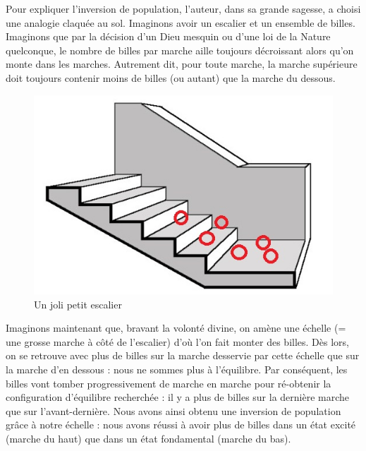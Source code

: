 Pour expliquer l'inversion de population, l'auteur, dans sa grande sagesse, a choisi une analogie claquée au sol. Imaginons avoir un escalier et un ensemble de billes. Imaginons que par la décision d'un Dieu mesquin ou d'une loi de la Nature quelconque, le nombre de billes par marche aille toujours décroissant alors qu'on monte dans les marches. Autrement dit, pour toute marche, la marche supérieure doit toujours contenir moins de billes (ou autant) que la marche du dessous.\\
\begin{figure}[tph]
    \centering
    \includegraphics[scale=1.0]{Images2/escalier2.jpg}
    \caption{Un joli petit escalier}
    \label{fig:escalier}
\end{figure}
Imaginons maintenant que, bravant la volonté divine, on amène une échelle (= une grosse marche à côté de l'escalier) d'où l'on fait monter des billes. Dès lors, on se retrouve avec plus de billes sur la marche desservie par cette échelle que sur la marche d'en dessous : nous ne sommes plus à l'équilibre. Par conséquent, les billes vont tomber progressivement de marche en marche pour ré-obtenir la configuration d'équilibre recherchée : il y a plus de billes sur la dernière marche que sur l'avant-dernière. Nous avons ainsi obtenu une inversion de population grâce à notre échelle : nous avons réussi à avoir plus de billes dans un état excité (marche du haut) que dans un état fondamental (marche du bas).\\


